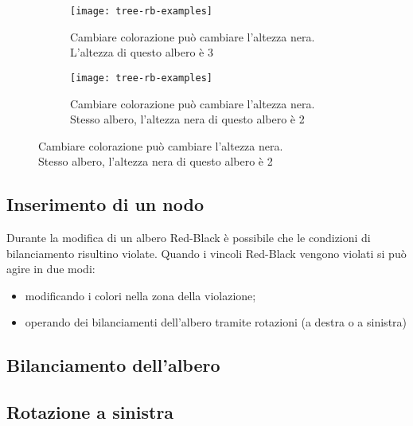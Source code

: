 \begin{figure}[H]
	\begin{subfigure}[t]{.48\linewidth}\centering
		\texttt{[image: tree-rb-examples]}
		\caption{Cambiare colorazione può cambiare l'altezza nera.\\L'altezza di questo albero è 3}
	\end{subfigure}
	\hfill
	\begin{subfigure}[t]{.48\linewidth}\centering
		\texttt{[image: tree-rb-examples]}
		\caption{Cambiare colorazione può cambiare l'altezza nera.\\Stesso albero, l'altezza nera di questo albero è 2}
	\end{subfigure}
\end{figure}

%

\clearpage
\subsection{Inserimento di un nodo}

Durante la modifica di un albero Red-Black è possibile che le condizioni di bilanciamento risultino violate.
Quando i vincoli Red-Black vengono violati si può agire in due modi:
\begin{itemize}
	\item modificando i colori nella zona della violazione;
	\item operando dei bilanciamenti dell'albero tramite rotazioni (a destra o a sinistra)
\end{itemize}

\subsection{Bilanciamento dell'albero}

\subsection*{Rotazione a sinistra}

